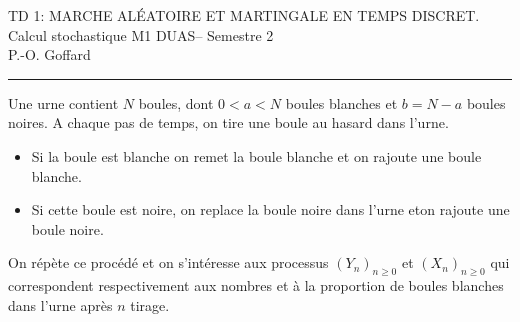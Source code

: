 \documentclass[11pt, answers]{exam}
\def\semester{Semestre 2}
\def\course{Calcul stochastique M1 DUAS}
\def\name{P.-O. Goffard}
\def\title{\MakeUppercase{TD 1: Marche aléatoire et martingale en temps discret.}}
\newcommand*{\Prob}{\mathbb{P}}
\newcommand*{\E}{\mathbb{E}}
\newcommand*{\F}{\mathcal{F}}
\begin{document}
{\center \textsc{\Large\title}\\
	\vspace*{1em}
	\course -- \semester\\
	\name\\
	\vspace*{2em}
	\hrule
\vspace*{2em}}

\begin{questions}

\question Une urne contient $N$ boules, dont $0<a<N$ boules blanches et $b = N-a$ boules noires. A chaque pas de temps, on tire une boule au hasard dans l'urne. 
\begin{itemize}
\item Si la boule est blanche on remet la boule blanche et on rajoute une boule blanche. 
\item Si cette boule est noire, on replace la boule noire dans l'urne eton rajoute une boule noire. 
\end{itemize}
On répète ce procédé et on s'intéresse aux processus $(Y_n)_{n\geq 0}$ et $(X_{n})_{n\geq 0 }$ qui correspondent respectivement aux nombres et à la proportion de boules blanches dans l'urne après $n$ tirage.
\end{questions}
\end{document}
